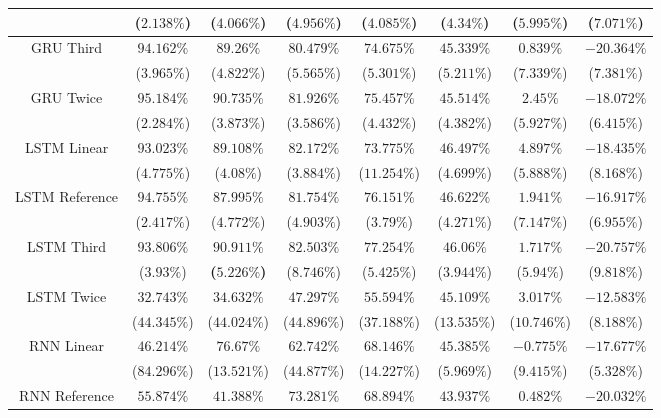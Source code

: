 \begin{table}[!ht]
{\begin{tabular}{|c|c|c|c|c|c|c|c|}
			 & \textbf{(}$\mathbf{2.138\%}$\textbf{)} & ($4.066\%$) & ($4.956\%$) & ($4.085\%$) & ($4.34\%$) & ($5.995\%$) & ($7.071\%$) \\ \hline
			\multirow{2}{*}{GRU Third} & $94.162\%$ & $89.26\%$ & $80.479\%$ & $74.675\%$ & $45.339\%$ & $0.839\%$ & $-20.364\%$ \\
			 & ($3.965\%$) & ($4.822\%$) & ($5.565\%$) & ($5.301\%$) & ($5.211\%$) & ($7.339\%$) & ($7.381\%$) \\ \hline
			\multirow{2}{*}{GRU Twice} & $95.184\%$ & $90.735\%$ & $81.926\%$ & $75.457\%$ & $45.514\%$ & $2.45\%$ & $-18.072\%$ \\
			 & ($2.284\%$) & ($3.873\%$) & ($3.586\%$) & ($4.432\%$) & ($4.382\%$) & ($5.927\%$) & ($6.415\%$) \\ \hline
			\multirow{2}{*}{LSTM Linear} & $93.023\%$ & $89.108\%$ & $82.172\%$ & $73.775\%$ & $46.497\%$ & $4.897\%$ & $-18.435\%$ \\
			 & ($4.775\%$) & ($4.08\%$) & ($3.884\%$) & ($11.254\%$) & ($4.699\%$) & ($5.888\%$) & ($8.168\%$) \\ \hline
			\multirow{2}{*}{LSTM Reference} & $94.755\%$ & $87.995\%$ & $81.754\%$ & $76.151\%$ & $46.622\%$ & $1.941\%$ & $-16.917\%$ \\
			 & ($2.417\%$) & ($4.772\%$) & ($4.903\%$) & ($3.79\%$) & ($4.271\%$) & ($7.147\%$) & ($6.955\%$) \\ \hline
			\multirow{2}{*}{LSTM Third} & $93.806\%$ & $\mathbf{90.911\%}$ & $82.503\%$ & $77.254\%$ & $46.06\%$ & $1.717\%$ & $-20.757\%$ \\
			 & ($3.93\%$) & \textbf{(}$\mathbf{5.226\%}$\textbf{)} & ($8.746\%$) & ($5.425\%$) & ($3.944\%$) & ($5.94\%$) & ($9.818\%$) \\ \hline
			\multirow{2}{*}{LSTM Twice} & $32.743\%$ & $34.632\%$ & $47.297\%$ & $55.594\%$ & $45.109\%$ & $3.017\%$ & $-12.583\%$ \\
			 & ($44.345\%$) & ($44.024\%$) & ($44.896\%$) & ($37.188\%$) & ($13.535\%$) & ($10.746\%$) & ($8.188\%$) \\ \hline
			\multirow{2}{*}{RNN Linear} & $46.214\%$ & $76.67\%$ & $62.742\%$ & $68.146\%$ & $45.385\%$ & $-0.775\%$ & $-17.677\%$ \\
			 & ($84.296\%$) & ($13.521\%$) & ($44.877\%$) & ($14.227\%$) & ($5.969\%$) & ($9.415\%$) & ($5.328\%$) \\ \hline
			\multirow{2}{*}{RNN Reference} & $55.874\%$ & $41.388\%$ & $73.281\%$ & $68.894\%$ & $43.937\%$ & $0.482\%$ & $-20.032\%$ \\

\end{tabular}}
\end{table}
